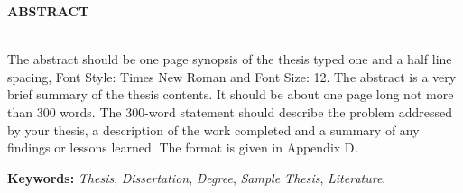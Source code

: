 {\centerline { {\large \textbf{ABSTRACT}}}}
~\\

The abstract should be one page synopsis of the thesis typed one and a half line spacing, Font Style: Times New Roman and Font Size: 12.  The abstract is a very brief summary of the thesis contents. It should be about one page long not more than 300 words.  The 300-word statement should describe the problem addressed by your thesis, a description of the work completed and a summary of any findings or lessons learned. The format is given in Appendix D.
     
\vskip 0.5cm
\noindent
\textbf{Keywords:} {\it Thesis}, {\it Dissertation}, {\it Degree}, {\it Sample Thesis}, {\it Literature}.  
